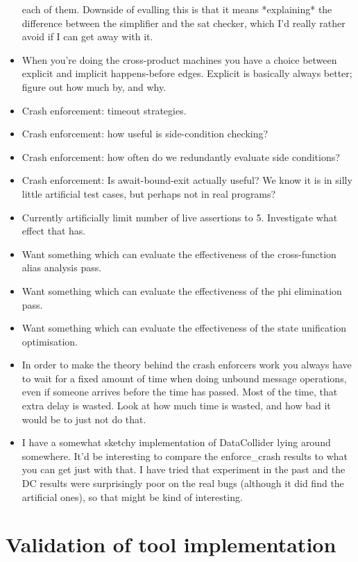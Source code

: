 \begin{itemize}
  each of them.  Downside of evalling this is that it means
  *explaining* the difference between the simplifier and the sat
  checker, which I'd really rather avoid if I can get away with it.
\item
  When you're doing the cross-product machines you have a choice
  between explicit and implicit happens-before edges.  Explicit is
  basically always better; figure out how much by, and why.
\item
  Crash enforcement: timeout strategies.
\item
  Crash enforcement: how useful is side-condition checking?
\item
  Crash enforcement: how often do we redundantly evaluate side conditions?
\item
  Crash enforcement: Is await-bound-exit actually useful?
  We know it is in silly little artificial test cases, but perhaps not in real programs?
\item
  Currently artificially limit number of live assertions to 5.
  Investigate what effect that has.
\item
  Want something which can evaluate the effectiveness of the
  cross-function alias analysis pass.
\item
  Want something which can evaluate the effectiveness of the phi
  elimination pass.
\item
  Want something which can evaluate the effectiveness of the state
  unification optimisation.
\item
  In order to make the theory behind the crash enforcers work you
  always have to wait for a fixed amount of time when doing unbound
  message operations, even if someone arrives before the time has
  passed.  Most of the time, that extra delay is wasted.  Look at how
  much time is wasted, and how bad it would be to just not do that.
\item
  I have a somewhat sketchy implementation of DataCollider lying
  around somewhere.  It'd be interesting to compare the enforce\_crash
  results to what you can get just with that.  I have tried that
  experiment in the past and the DC results were surprisingly poor on
  the real bugs (although it did find the artificial ones), so that
  might be kind of interesting.
\end{itemize}

\section{Validation of tool implementation}

